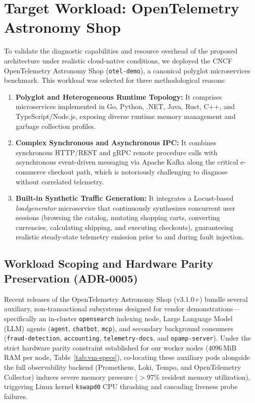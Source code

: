 \section{Target Workload: OpenTelemetry Astronomy Shop}
\label{sec:workload}

To validate the diagnostic capabilities and resource overhead of the proposed architecture under realistic cloud-native conditions, we deployed the CNCF OpenTelemetry Astronomy Shop (\texttt{otel-demo}), a canonical polyglot microservices benchmark. This workload was selected for three methodological reasons:
\begin{enumerate}
    \item \textbf{Polyglot and Heterogeneous Runtime Topology:} It comprises microservices implemented in Go, Python, .NET, Java, Rust, C++, and TypeScript/Node.js, exposing diverse runtime memory management and garbage collection profiles.
    \item \textbf{Complex Synchronous and Asynchronous IPC:} It combines synchronous HTTP/REST and gRPC remote procedure calls with asynchronous event-driven messaging via Apache Kafka along the critical e-commerce checkout path, which is notoriously challenging to diagnose without correlated telemetry.
    \item \textbf{Built-in Synthetic Traffic Generation:} It integrates a Locust-based \textit{loadgenerator} microservice that continuously synthesizes concurrent user sessions (browsing the catalog, mutating shopping carts, converting currencies, calculating shipping, and executing checkouts), guaranteeing realistic steady-state telemetry emission prior to and during fault injection.
\end{enumerate}

\subsection{Workload Scoping and Hardware Parity Preservation (ADR-0005)}
\label{subsec:workload-scoping}

Recent releases of the OpenTelemetry Astronomy Shop (v3.1.0+) bundle several auxiliary, non-transactional subsystems designed for vendor demonstrations---specifically an in-cluster \texttt{opensearch} indexing node, Large Language Model (LLM) agents (\texttt{agent}, \texttt{chatbot}, \texttt{mcp}), and secondary background consumers (\texttt{fraud-detection}, \texttt{accounting}, \texttt{telemetry-docs}, and \texttt{opamp-server}). Under the strict hardware parity constraint established for our worker nodes ($4096\,\text{MiB}$ RAM per node, Table~\ref{tab:vm-specs}), co-locating these auxiliary pods alongside the full observability backend (Prometheus, Loki, Tempo, and OpenTelemetry Collector) induces severe memory pressure ($>97\%$ resident memory utilization), triggering Linux kernel \texttt{kswapd0} CPU thrashing and cascading liveness probe failures.

